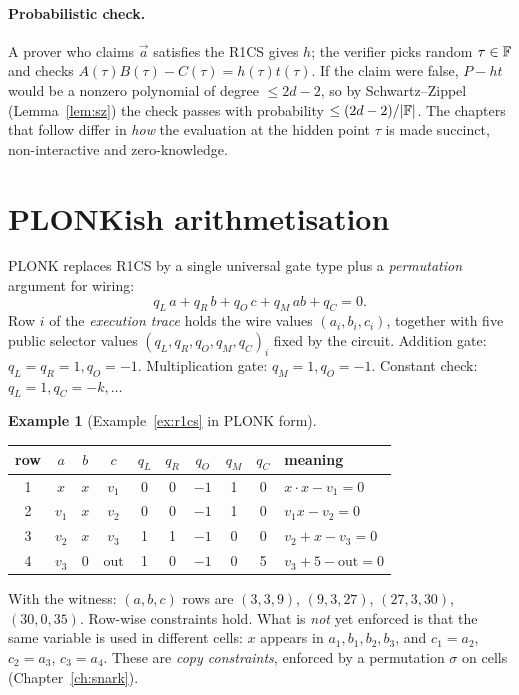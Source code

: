 \documentclass[11pt,a4paper]{report}
\theoremstyle{plain}
\theoremstyle{definition}
\newtheorem{example}[theorem]{Example}
\theoremstyle{remark}
\begin{document}
\paragraph{Probabilistic check.} A prover who claims $\vec a$ satisfies the R1CS gives $h$; the verifier picks random $\tau\in\mathbb{F}$ and checks $A(\tau)B(\tau)-C(\tau)=h(\tau)t(\tau)$. If the claim were false, $P-ht$ would be a nonzero polynomial of degree $\le2d-2$, so by Schwartz--Zippel (Lemma~\ref{lem:sz}) the check passes with probability $\le(2d-2)/|\mathbb{F}|$. The chapters that follow differ in \emph{how} the evaluation at the hidden point $\tau$ is made succinct, non-interactive and zero-knowledge.

\section{PLONKish arithmetisation}\label{sec:plonkish}
PLONK replaces R1CS by a single universal gate type plus a \emph{permutation} argument for wiring:
\[q_L\,a+q_R\,b+q_O\,c+q_M\,ab+q_C=0.\]
Row $i$ of the \emph{execution trace} holds the wire values $(a_i,b_i,c_i)$, together with five public selector values $(q_L,q_R,q_O,q_M,q_C)_i$ fixed by the circuit. Addition gate: $q_L=q_R=1,q_O=-1$. Multiplication gate: $q_M=1,q_O=-1$. Constant check: $q_L=1,q_C=-k,\ldots$
\begin{example}[Example~\ref{ex:r1cs} in PLONK form]
\begin{center}\small
\begin{tabular}{c|ccc|ccccc|l}
row & $a$ & $b$ & $c$ & $q_L$ & $q_R$ & $q_O$ & $q_M$ & $q_C$ & meaning\\\hline
1 & $x$ & $x$ & $v_1$ & 0&0&$-1$&1&0 & $x\cdot x-v_1=0$\\
2 & $v_1$ & $x$ & $v_2$ & 0&0&$-1$&1&0 & $v_1x-v_2=0$\\
3 & $v_2$ & $x$ & $v_3$ & 1&1&$-1$&0&0 & $v_2+x-v_3=0$\\
4 & $v_3$ & 0 & $\mathrm{out}$ & 1&0&$-1$&0&5 & $v_3+5-\mathrm{out}=0$
\end{tabular}
\end{center}
With the witness: $(a,b,c)$ rows are $(3,3,9)$, $(9,3,27)$, $(27,3,30)$, $(30,0,35)$. Row-wise constraints hold. What is \emph{not} yet enforced is that the same variable is used in different cells: $x$ appears in $a_1,b_1,b_2,b_3$, and $c_1=a_2$, $c_2=a_3$, $c_3=a_4$. These are \emph{copy constraints}, enforced by a permutation $\sigma$ on cells (Chapter~\ref{ch:snark}).
\end{example}
\end{document}
